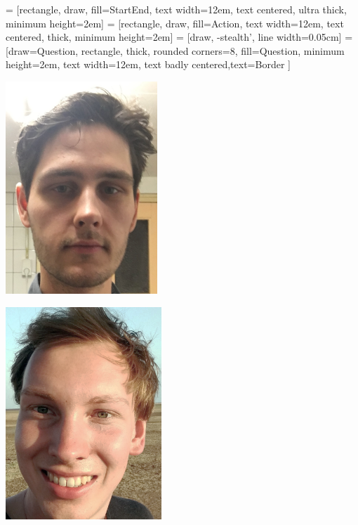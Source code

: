 \newpage
\thispagestyle{empty}

%


 = [rectangle, draw, fill={StartEnd}, 
    text width=12em, text centered, ultra thick, minimum height=2em]
 = [rectangle, draw, fill={Action}, 
    text width=12em, text centered, thick, minimum height=2em]
 = [draw, -stealth', line width=0.05cm]
 = [draw={Question}, rectangle, thick, rounded corners=8, fill={Question}, minimum height=2em, text width=12em, text badly centered,text=Border ]

\mbox{}
\vfill
\begin{minipage}[c]{.45\textwidth}
\centering
  \includegraphics[height=80mm,center]{img/Frits.png}
\end{minipage}%
\hfill
\begin{minipage}[c]{.45\textwidth}
  \centering
  \includegraphics[height=80mm,center]{img/Willem.png}
\end{minipage}
